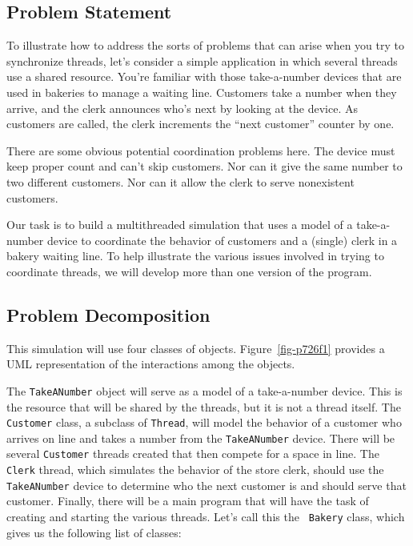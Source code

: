 \subsection{Problem Statement}
\noindent To illustrate how to address the sorts of problems that can arise when
you try to synchronize threads, let's consider a simple application in
which several threads use a shared resource.   You're familiar with
those take-a-number devices that are used in bakeries to manage a
waiting line.  Customers take a number when they arrive, and the clerk
announces who's next by looking at the device.  As customers are
called, the clerk increments the ``next customer'' counter by one.

There are some obvious potential coordination problems here.   The device
must keep proper count and can't skip customers.  Nor can it give the
same number to two different customers.  Nor can it allow the clerk to
serve nonexistent customers.

Our task is to build a multithreaded simulation that uses a
model of a take-a-number device to coordinate the behavior of
customers and a (single) clerk in a bakery waiting line.  To help
illustrate the various issues involved in trying to coordinate
threads, we will develop more than one version of the program.

\subsection*{Problem Decomposition}
\noindent This simulation will use four classes of objects.
  Figure~\ref{fig-p726f1}
provides a UML representation of the interactions among the
objects. 
\begin{figure}[h!]
\end{figure}
The {\tt TakeANumber} object will serve as a model of a
take-a-number device.  This is the resource that will be shared by the
threads, but it is not a thread itself.  The {\tt Customer} class, a
subclass of {\tt Thread}, will model the behavior of a customer who
arrives on line and takes a number from the {\tt TakeANumber} device.
There will be several {\tt Customer} threads created that then compete
for a space in line.  The {\tt Clerk} thread, which simulates the
behavior of the store clerk, should use the {\tt TakeANumber} device
to determine who the next customer is and should serve that customer.
Finally, there will be a main program that will have the task of
creating and starting the various threads.  Let's call this the {\tt
Bakery} class, which gives us the following list of classes:

